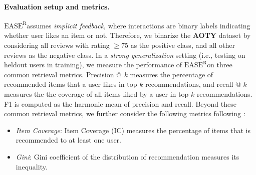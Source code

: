 \documentclass{article}
\newcommand{\aoty}{{\bf AOTY}\xspace}
\newcommand{\easer}{$\text{EASE}^\text{R}$}
\begin{document}
\paragraph*{Evaluation setup and metrics.}
\easer assumes {\em implicit feedback}, where interactions are binary
labels indicating whether user likes an item or not.
Therefore, we binarize the \aoty dataset by considering all reviews with rating
 $\ge 75$ as the positive class, and all other reviews as the negative class.
In a {\em strong generalization} setting (i.e., testing on heldout users in
 training), we measure the performance of \easer on three common retrieval
 metrics.
Precision @ $k$ measures the percentage of recommended items that a user likes
 in top-$k$ recommendations, and recall @ $k$ measures the the coverage of all
 items liked by a user in top-$k$ recommendations.
F1 is computed as the harmonic mean of precision and recall.
Beyond these common retrieval metrics, we further consider the following
 metrics following \citet{anelliTopNRecommendationAlgorithms2022}:
 \begin{itemize} \item {\em Item Coverage}: Item Coverage (IC) measures the
 percentage of items that is recommended to at least one user.
\item {\em Gini}: Gini coefficient of the distribution of recommendation
measures its inequality.
\end{itemize}
\end{document}
